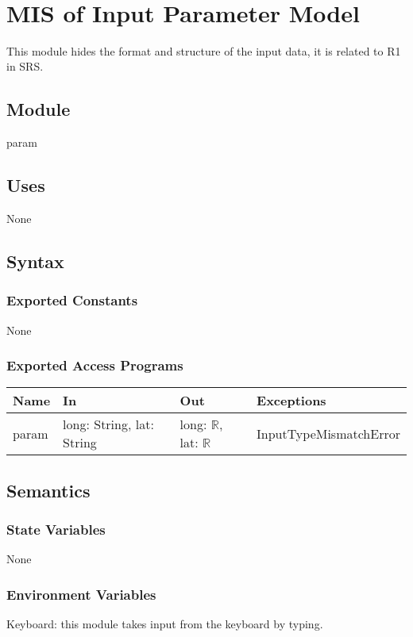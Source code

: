\documentclass[12pt, titlepage]{article}
\begin{document}
~\newpage

\section{MIS of Input Parameter Model} \label{inputParameterModule} 
This module hides the format and structure of the input data, it is related to R1 in SRS.
\subsection{Module}
param
\subsection{Uses}
None

\subsection{Syntax}

\subsubsection{Exported Constants}
None

\subsubsection{Exported Access Programs}

\begin{center}
\begin{tabular}{p{2cm} p{4.5cm} p{3cm} p{4cm}}
\hline
\textbf{Name} & \textbf{In} & \textbf{Out} & \textbf{Exceptions} \\
\hline
param & long: String, lat: String & long: $\mathbb{R}$, lat: $\mathbb{R}$ & InputTypeMismatchError \\
\hline
\end{tabular}
\end{center}

\subsection{Semantics}

\subsubsection{State Variables}
None

\subsubsection{Environment Variables}
Keyboard: this module takes input from the keyboard by typing.
\end{document}
